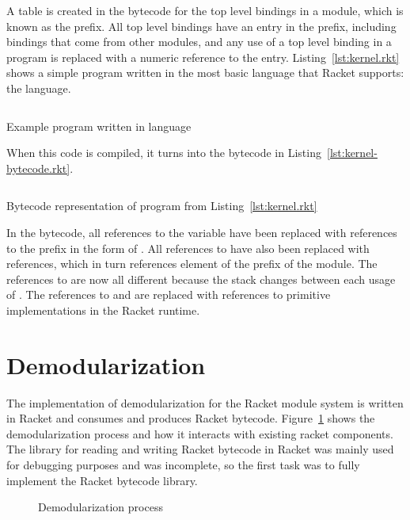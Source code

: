 A table is created in the bytecode for the top level bindings in a module, which is known as the prefix.
All top level bindings have an entry in the prefix, including bindings that come from other modules, and any use of a top level binding in a program is replaced with a numeric reference to the entry.
Listing~\ref{lst:kernel.rkt} shows a simple program written in the most basic language that Racket supports: the  language.
\begin{listing}
  \inputminted{racket}{listings/kernel.rkt}
  \caption{Example program written in  language}
  \label{lst:kernel.rkt}
\end{listing}
When this code is compiled, it turns into the bytecode in Listing~\ref{lst:kernel-bytecode.rkt}. 
\begin{listing}
  \inputminted{racket}{listings/kernel-bytecode.rkt}
  \caption{Bytecode representation of program from Listing~\ref{lst:kernel.rkt}}
  \label{lst:kernel-bytecode.rkt}
\end{listing}

In the bytecode, all references to the variable  have been replaced with references to the prefix in the form of . 
All references to  have also been replaced with  references, which in turn references element  of the prefix of the  module.
The references to  are now all different because the stack changes between each usage of .
The references to  and \racket{+} are replaced with references to primitive implementations in the Racket runtime. 

\section{Demodularization}

The implementation of demodularization for the Racket module system is written in Racket and consumes and produces Racket bytecode.
Figure~\ref{fig:demod} shows the demodularization process and how it interacts with existing racket components.
The library for reading and writing Racket bytecode in Racket was mainly used for debugging purposes and was incomplete, so the first task was to fully implement the Racket bytecode library.
\begin{figure}
  
  \label{fig:demod}
  \caption{Demodularization process}
\end{figure}

